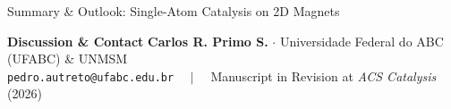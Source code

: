 \documentclass[aspectratio=169]{beamer}
\begin{document}
\begin{frame}{Summary \& Outlook: Single-Atom Catalysis on 2D Magnets}
  \vspace{0.4em}
  \begin{block}{\centering \textbf{Discussion \& Contact}}
    \centering\footnotesize
    \textbf{\textcolor{nordEight}{Carlos R. Primo S.}} $\cdot$ \textcolor{nordFour}{Universidade Federal do ABC (UFABC) \& UNMSM}\\
    \vspace{0.1em}
    \scriptsize \textcolor{nordNine}{\texttt{pedro.autreto@ufabc.edu.br}} $\quad\vert\quad$ \textcolor{nordFive}{Manuscript in Revision at \textit{ACS Catalysis} (2026)}
  \end{block}
\end{frame}
\end{document}
